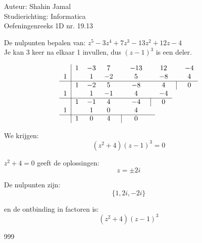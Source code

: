 \documentclass[a4paper]{article}
\begin{document}
  
\noindent \large Auteur: Shahin Jamal \\
\noindent \large Studierichting: Informatica\\
\noindent \large Oefeningenreeks 1D nr. 19.13\\

\medskip

\normalsize


De nulpunten bepalen van: $z^5 - 3z^4 + 7z^3 - 13z^2 + 12z - 4$\\

Je kan 3 keer na elkaar 1 invullen, dus $(z-1)^3$ is een deler.

\[
\begin{tabular}{c|ccccccccc}
& $1$ & $-3$ & $7$ & & $-13$ & & $12$ & & $-4$ \\
$1$ & & $1$ & $-2$ & & $5$ & & $-8$ & & $4$ \\ \hline
& $1$ & $-2$ & $5$ & & $-8$ & & $4$ & \vline & $0$ \\
$1$ & & $1$ & $-1$ & & $4$ & & $-4$ & & \\ \cline{1-8}
& $1$ & $-1$ & $4$ & & $-4$ & \vline & $0$ & & \\
$1$ & & $1$ & $0$ & & $4$ & & & & \\ \cline{1-7}
& $1$ & $0$ & $4$ & \vline & {$0$} & & & &
\end{tabular}
\]

We krijgen:
\[
(z^2 + 4)(z - 1)^3 = 0
\]

\( z^2 + 4 = 0 \) geeft de oplossingen:
\[
z = \pm 2i
\]

De nulpunten zijn:
\[
\{ 1, 2i, -2i \}
\]

en de ontbinding in factoren is: 
\[
(z^2 + 4)(z - 1)^3
\]

\begin{thebibliography}{999}
\end{thebibliography}
\end{document}
